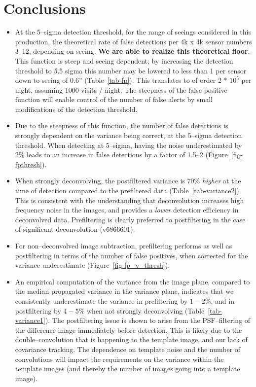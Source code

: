 \documentclass[prd, nofootinbib, floatfix, 11pt,tightenlines,times]{article}
\begin{document}
\section{Conclusions}

\begin{itemize}


\item At the 5--sigma detection threshold, for the range of seeings
  considered in this production, the theoretical rate of false
  detections per 4k x 4k sensor numbers 3--12, depending on seeing.
  {\bf We are able to realize this theoretical floor}.  This function
  is steep and seeing dependent; by increasing the detection threshold
  to 5.5 sigma this number may be lowered to less than 1 per sensor
  down to seeing of 0.6'' (Table~\ref{tab-fp}).  This translates to of
  order 2 * $10^5$ per night, assuming 1000 visits / night.  The
  steepness of the false positive function will enable control of the
  number of false alerts by small modifications of the detection
  threshold.

\item Due to the steepness of this function, the number of false
  detections is strongly dependent on the variance being correct, at
  the 5--sigma detection threshold.  When detecting at 5--sigma,
  having the noise underestimated by 2\% leads to an increase
  in false detections by a factor of 1.5--2 (Figure~\ref{fig-fpthresh}).

\item When strongly deconvolving, the postfiltered variance is 70\%
  {\it higher} at the time of detection compared to the prefiltered
  data (Table~\ref{tab-variance2}).  This is consistent with the
  understanding that deconvolution increases high frequency noise in
  the images, and provides a {\it lower} detection efficiency in
  deconvolved data.  Prefiltering is clearly preferred to postfiltering 
  in the case of significant deconvolution (v6866601).

\item For non--deconvolved image subtraction, prefiltering performs as
  well as postfiltering in terms of the number of false positives, when 
  corrected for the variance underestimate (Figure~\ref{fig-fp_v_thresh}).

\item An empirical computation of the variance from the image plane,
  compared to the median propagated variance in the variance plane,
  indicates that we consistently underestimate the variance in
  prefiltering by $1-2\%$, and in postfiltering by $4-5\%$ when not
  strongly deconvolving (Table~\ref{tab-variance1}).  The postfiltering
  issue is shown to arise from the PSF--filtering of the difference
  image immediately before detection.  This is likely due to the
  double--convolution that is happening to the template image, and our
  lack of covariance tracking. The dependence on template noise and
  the number of convolutions will impact the requirements on the
  variance within the template images (and thereby the number of
  images going into a template image).


\end{itemize}
\end{document}
